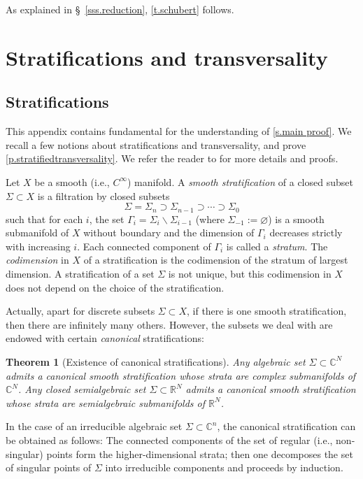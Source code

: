 \documentclass[10pt, a4paper]{amsart}
\theoremstyle{plain}
\newtheorem{otherthm}[lemma]{Theorem}
\theoremstyle{definition}
\theoremstyle{remark}
\theoremstyle{note}
\numberwithin{equation}{section}
\begin{document}
As explained in \S~\ref{sss.reduction}, \cref{t.schubert} follows.

\section{Stratifications and transversality}\label{a.strat_trans}

\subsection{Stratifications}
This appendix contains fundamental for the understanding of \cref{s.main proof}. We recall a few notions about stratifications and transversality, and prove \cref{p.stratifiedtransversality}.
We refer the reader to \cite{GWPL,Mather_71} for more details and proofs.

\medskip

Let $X$ be a smooth (i.e., $C^\infty$) manifold. 
A \emph{smooth stratification} of a closed subset ${\Sigma}\subset X$ is a filtration by closed subsets 
$$
{\Sigma} = {\Sigma}_n \supset {\Sigma}_{n-1} \supset \cdots \supset {\Sigma}_0
$$ 
such that for each $i$, the set $\Gamma_i = {\Sigma}_i {\smallsetminus} {\Sigma}_{i-1}$ (where $\Sigma_{-1}:={\varnothing}$) is a smooth submanifold of $X$ without boundary and the dimension of $\Gamma_i$ decreases strictly with increasing $i$. 
Each connected component of $\Gamma_i$ is called a \emph{stratum}. 
The \emph{codimension} in $X$ of a stratification is the codimension of the stratum of largest dimension. 
A stratification of  a set ${\Sigma}$ is not unique, but this codimension in $X$ does not depend on the choice of the stratification.

Actually, apart for discrete subsets ${\Sigma}\subset X$, if there is one smooth stratification, 
then there are infinitely many others. 
However, the subsets we deal with 
are endowed with certain \emph{canonical} stratifications:

\begin{otherthm}[Existence of canonical stratifications]\label{t.canonical_stratif}
Any algebraic set ${\Sigma}\subset {\mathbb{C}}^N$ admits a canonical smooth stratification
whose strata are complex submanifolds of ${\mathbb{C}}^N$.
Any closed semialgebraic set ${\Sigma}\subset {\mathbb{R}}^N$ admits a canonical smooth stratification
whose strata are semialgebraic submanifolds of ${\mathbb{R}}^N$.
\end{otherthm}

In the case of an irreducible algebraic set ${\Sigma}\subset {\mathbb{C}}^n$, 
the canonical stratification can be obtained as follows:
The connected components of the set of regular (i.e., non-singular) points form the higher-dimensional 
strata; then one decomposes the set of singular points of ${\Sigma}$ into irreducible components and proceeds by 
induction.
\end{document}
